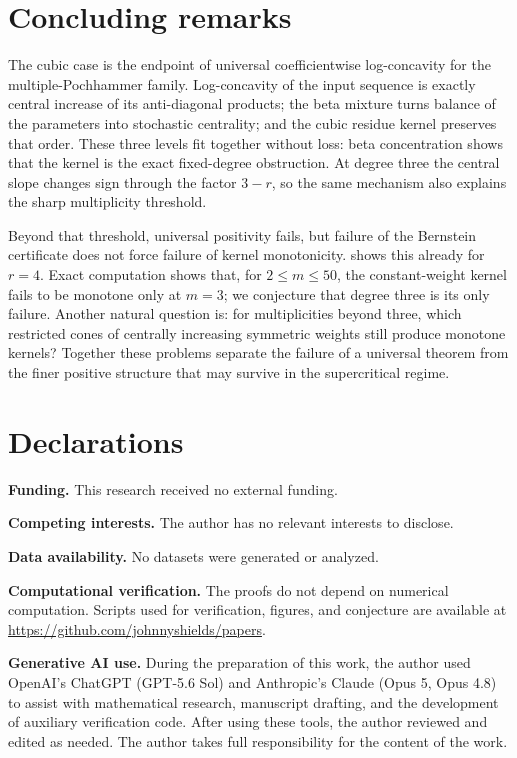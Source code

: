 \documentclass[11pt,a4paper]{amsart}
\numberwithin{equation}{section}
\theoremstyle{plain}
\theoremstyle{definition}
\begin{document}
\section{Concluding remarks}\label{sec:conclusion}

The cubic case is the endpoint of universal coefficientwise log-concavity for the
multiple-Pochhammer family.  Log-concavity of the input sequence is exactly central
increase of its anti-diagonal products; the beta mixture turns balance of the
parameters into stochastic centrality; and the cubic residue kernel preserves that
order.  These three levels fit together without loss: beta
concentration shows that the kernel is the exact fixed-degree obstruction.  At degree
three the central slope changes sign through the factor \(3-r\), so the same
mechanism also explains the sharp multiplicity threshold.

Beyond that threshold, universal positivity fails, but failure of the Bernstein
certificate does not force failure of kernel monotonicity.  
shows this already for \(r=4\).  Exact computation shows that, for
\(2\le m\le50\), the constant-weight kernel fails to be monotone only at \(m=3\);
we conjecture that degree three is its only failure.  Another natural question is: for
multiplicities beyond three, which restricted cones of centrally increasing symmetric
weights still produce monotone kernels?  Together these problems separate the
failure of a universal theorem from the finer positive structure that may survive in
the supercritical regime.

\section*{Declarations}
{\footnotesize

\noindent\textbf{Funding.} This research received no external funding.

\smallskip
\noindent\textbf{Competing interests.} The author has no relevant interests to disclose.

\smallskip
\noindent\textbf{Data availability.} No datasets were generated or analyzed.

\smallskip
\noindent\textbf{Computational verification.} The proofs do not depend on numerical computation.  Scripts used for verification, figures, and conjecture are available at \url{https://github.com/johnnyshields/papers}.

\smallskip
\noindent\textbf{Generative AI use.} During the preparation of this work, the author used OpenAI's ChatGPT (GPT-5.6 Sol) and Anthropic's Claude (Opus 5, Opus 4.8) to assist with mathematical research, manuscript drafting, and the development of auxiliary verification code.  After using these tools, the author reviewed and edited as needed.  The author takes full responsibility for the content of the work.\par}
\end{document}
